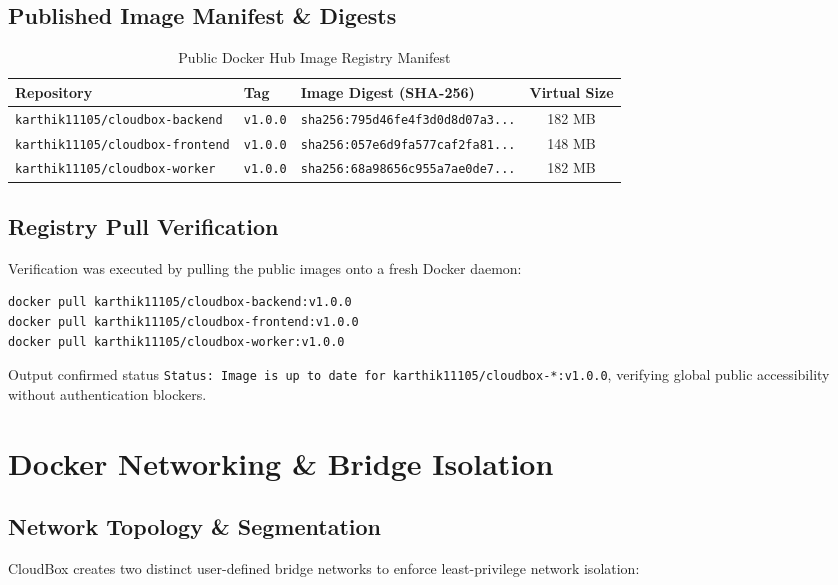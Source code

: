 \documentclass[11pt,a4paper]{report}
\begin{document}
\section{Published Image Manifest \& Digests}
\begin{table}[h!]
\centering
\small
\begin{tabularx}{\textwidth}{lllc}
\toprule
\textbf{Repository} & \textbf{Tag} & \textbf{Image Digest (SHA-256)} & \textbf{Virtual Size} \\
\midrule
\texttt{karthik11105/cloudbox-backend} & \texttt{v1.0.0} & \texttt{sha256:795d46fe4f3d0d8d07a3...} & 182 MB \\
\texttt{karthik11105/cloudbox-frontend} & \texttt{v1.0.0} & \texttt{sha256:057e6d9fa577caf2fa81...} & 148 MB \\
\texttt{karthik11105/cloudbox-worker} & \texttt{v1.0.0} & \texttt{sha256:68a98656c955a7ae0de7...} & 182 MB \\
\bottomrule
\end{tabularx}
\caption{Public Docker Hub Image Registry Manifest}
\end{table}

\section{Registry Pull Verification}
Verification was executed by pulling the public images onto a fresh Docker daemon:
\begin{lstlisting}[language=bash]
docker pull karthik11105/cloudbox-backend:v1.0.0
docker pull karthik11105/cloudbox-frontend:v1.0.0
docker pull karthik11105/cloudbox-worker:v1.0.0
\end{lstlisting}
Output confirmed status \texttt{Status: Image is up to date for karthik11105/cloudbox-*:v1.0.0}, verifying global public accessibility without authentication blockers.

\clearpage

\chapter{Docker Networking \& Bridge Isolation}

\section{Network Topology \& Segmentation}
CloudBox creates two distinct user-defined bridge networks to enforce least-privilege network isolation:
\end{document}
